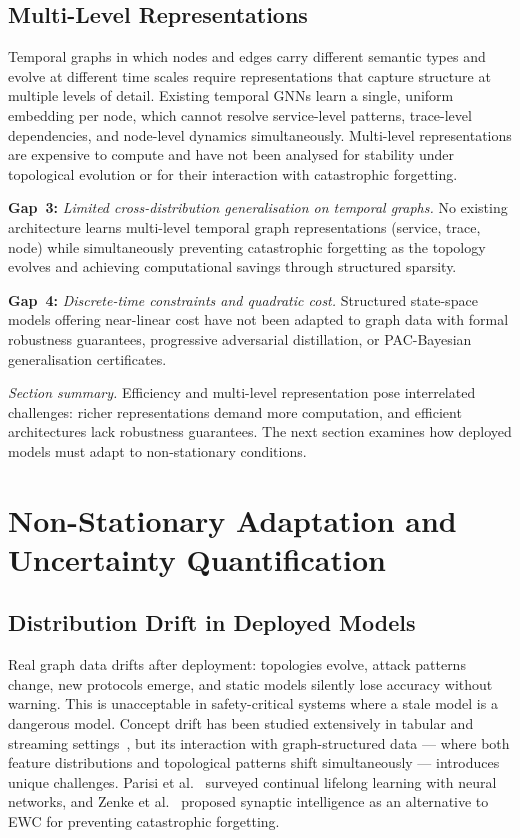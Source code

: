 \subsection{Multi-Level Representations}

Temporal graphs in which nodes and edges carry different semantic types and evolve at different time scales require representations that capture structure at multiple levels of detail. Existing temporal GNNs learn a single, uniform embedding per node, which cannot resolve service-level patterns, trace-level dependencies, and node-level dynamics simultaneously. Multi-level representations are expensive to compute and have not been analysed for stability under topological evolution or for their interaction with catastrophic forgetting.

\medskip
\noindent\textbf{Gap~3:} \emph{Limited cross-distribution generalisation on temporal graphs.} No existing architecture learns multi-level temporal graph representations (service, trace, node) while simultaneously preventing catastrophic forgetting as the topology evolves and achieving computational savings through structured sparsity.

\medskip
\noindent\textbf{Gap~4:} \emph{Discrete-time constraints and quadratic cost.} Structured state-space models offering near-linear cost have not been adapted to graph data with formal robustness guarantees, progressive adversarial distillation, or PAC-Bayesian generalisation certificates.

\medskip
\noindent\textit{Section summary.} Efficiency and multi-level representation pose interrelated challenges: richer representations demand more computation, and efficient architectures lack robustness guarantees. The next section examines how deployed models must adapt to non-stationary conditions.


\section{Non-Stationary Adaptation and Uncertainty Quantification}
\label{sec:nonstationarity}

\subsection{Distribution Drift in Deployed Models}

Real graph data drifts after deployment: topologies evolve, attack patterns change, new protocols emerge, and static models silently lose accuracy without warning. This is unacceptable in safety-critical systems where a stale model is a dangerous model. Concept drift has been studied extensively in tabular and streaming settings~\cite{Gama2014,Lu2019}, but its interaction with graph-structured data --- where both feature distributions and topological patterns shift simultaneously --- introduces unique challenges. Parisi et al.~\cite{Parisi2019} surveyed continual lifelong learning with neural networks, and Zenke et al.~\cite{Zenke2017,Wilson2020} proposed synaptic intelligence as an alternative to EWC for preventing catastrophic forgetting.


